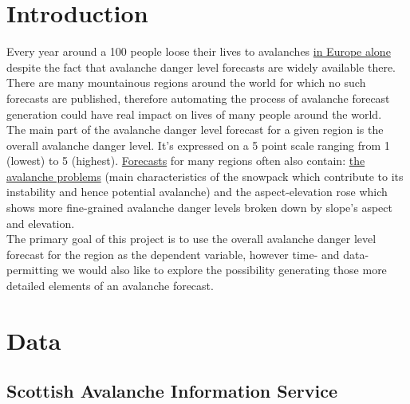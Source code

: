 \documentclass{article}
\newcommand{\sais}{Scottish Avalanche Information Service}
\begin{document}

\section{Introduction}

	Every year around a 100 people loose their lives to avalanches \href{https://www.avalanches.org/fatalities/}{in Europe alone} despite the fact that avalanche danger level forecasts are widely available there. There are many mountainous regions around the world for which no such forecasts are published, therefore automating the process of avalanche forecast generation could have real impact on lives of many people around the world. \\

	The main part of the avalanche danger level forecast for a given region is the overall avalanche danger level. It's expressed on a 5 point scale ranging from 1 (lowest) to 5 (highest).	\href{https://www.shastaavalanche.org/page/how-read-advisory}{Forecasts} for many regions often also contain: \href{https://avalanche.state.co.us/forecasts/tutorial/avalanche-problems}{the avalanche problems} (main characteristics of the snowpack which contribute to its instability and hence potential avalanche) and the aspect-elevation rose which shows more fine-grained avalanche danger levels broken down by slope's aspect and elevation. \\
	The primary goal of this project is to use the overall avalanche danger level forecast for the region as the dependent variable, however time- and data-permitting we would also like to explore the possibility generating those more detailed elements of an avalanche forecast.	
	
\section{Data}


\subsection{\sais}\label{sec:data_sais}
\end{document}
